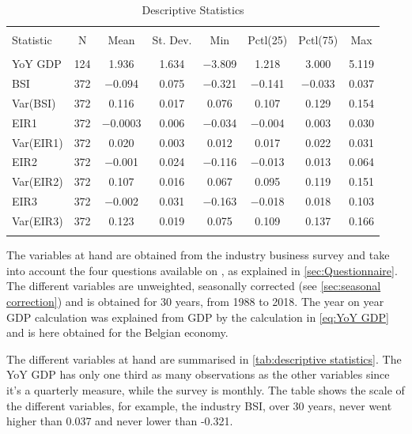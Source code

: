 \documentclass[12pt,a4paper,oneside]{book}
\begin{document}
\begin{table}[!htbp]  \centering \footnotesize 
  \caption{Descriptive Statistics} 
  \label{tab:descriptive statistics} 
\begin{tabular}{@{\extracolsep{5pt}}lccccccc} 
\\[-1.8ex]\hline 
\hline \\[-1.8ex] 
Statistic & \multicolumn{1}{c}{N} & \multicolumn{1}{c}{Mean} & \multicolumn{1}{c}{St. Dev.} & \multicolumn{1}{c}{Min} & \multicolumn{1}{c}{Pctl(25)} & \multicolumn{1}{c}{Pctl(75)} & \multicolumn{1}{c}{Max} \\ 
\hline \\[-1.8ex] 
YoY GDP     & 124       & 1.936 & 1.634 & $-$3.809 & 1.218 & 3.000 & 5.119 \\ 
BSI         & 372       & $-$0.094 & 0.075 & $-$0.321 & $-$0.141 & $-$0.033 & 0.037 \\ 
Var(BSI)    & 372       & 0.116 & 0.017 & 0.076 & 0.107 & 0.129 & 0.154 \\ 
EIR1        & 372       & $-$0.0003 & 0.006 & $-$0.034 & $-$0.004 & 0.003 & 0.030 \\ 
Var(EIR1)   & 372       & 0.020 & 0.003 & 0.012 & 0.017 & 0.022 & 0.031 \\ 
EIR2        & 372       & $-$0.001  & 0.024 & $-$0.116 & $-$0.013 & 0.013 & 0.064 \\ 
Var(EIR2)   & 372       & 0.107 & 0.016 & 0.067 & 0.095 & 0.119 & 0.151 \\ 
EIR3        & 372  & $-$0.002  & 0.031 & $-$0.163 & $-$0.018 & 0.018 & 0.103 \\ 
Var(EIR3)   & 372       & 0.123 & 0.019 & 0.075 & 0.109 & 0.137 & 0.166 \\ 
\hline \\[-1.8ex] 
\end{tabular} 
\end{table} 

The variables at hand are obtained from the industry business survey and take into account the four questions available on , as explained in \autoref{sec:Questionnaire}.
The different variables are unweighted, seasonally corrected (see \autoref{sec:seasonal correction}) and is obtained for 30 years, from 1988 to 2018.
The year on year GDP calculation was explained from GDP by the calculation in \autoref{eq:YoY GDP} and is here obtained for the Belgian economy.

The different variables at hand are summarised in \autoref{tab:descriptive statistics}. The YoY GDP has only one third as many observations as the other variables since it's a quarterly measure, while the survey is monthly. 
The table shows the scale of the different variables, for example, the industry BSI, over 30 years, never went higher than 0.037 and never lower than -0.321.
\end{document}
